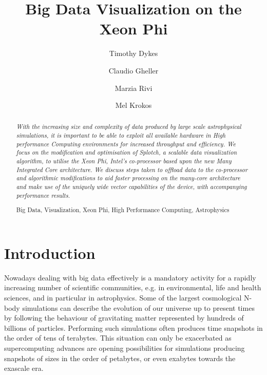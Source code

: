 \documentclass[runningheads,a4paper]{llncs}
\newcommand{\keywords}[1]{\par\addvspace\baselineskip
\noindent\keywordname\enspace\ignorespaces#1}
\begin{document}
\mainmatter  %

\title{Big Data Visualization on the Xeon Phi}

\author{Timothy Dykes
\and Claudio Gheller
\and Marzia Rivi
\and Mel Krokos
}

\institute{   
   University of Portsmouth,
   Portsmouth, U.K.\\
\mailsa\\
\and
  CSCS-ETHZ,
  Lugano, Switzerland\\
  \email{cgheller@cscs.ch}
\and
   University of Oxford,
   Oxford, U.K.\\
   \email{rivi@physics.ox.ac.uk}\\
}
\maketitle


\begin{abstract}
\emph{With the increasing size and complexity of data produced by large scale astrophysical simulations, 
it is important to be able to exploit all available hardware in High performance Computing environments 
for increased throughput and efficiency. We focus on the modification and optimisation of Splotch, a 
scalable data visualization algorithm, to utilise the Xeon Phi, Intel's co-processor based upon the new 
Many Integrated Core architecture. We discuss steps taken to offload data to the co-processor and 
algorithmic modifications to aid faster processing on the many-core architecture and make use of the 
uniquely wide vector capabilities of the device, with accompanying performance results.}

\keywords Big Data, Visualization, Xeon Phi, High Performance Computing, Astrophysics
\end{abstract}


\section{Introduction}
\label{sect:introduction}

Nowadays dealing with big data effectively is a mandatory activity for a rapidly increasing number of scientific communities,
e.g. in environmental, life and health sciences, and in particular in astrophysics. Some of the largest cosmological N-body
simulations can describe the evolution of our universe up to present times by following the behaviour of gravitating matter
represented by hundreds of billions of particles. Performing such simulations often produces time snapshots in the order of tens
of terabytes. This situation can only be exacerbated as supercomputing advances are opening possibilities for simulations
producing snapshots of sizes in the order of petabytes, or even exabytes towards the exascale era.
\end{document}
